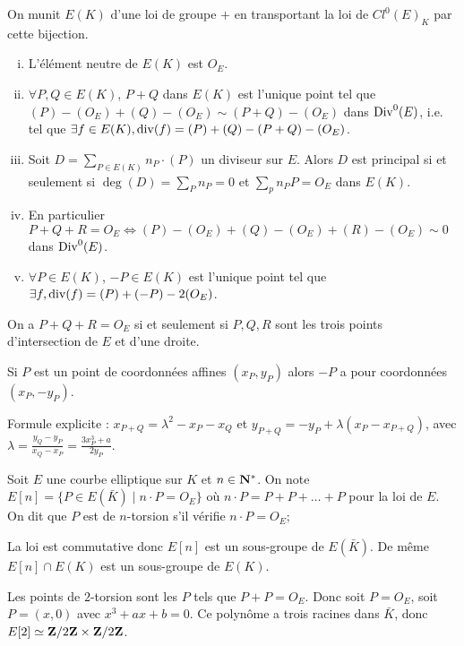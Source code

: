 	\begin{defn}
		On munit $E(K)$ d'une loi de groupe $+$ en transportant la loi de $Cl^0 (E)_K$ par cette bijection.
	\end{defn}
	
	\begin{pop}
		\begin{enumerate}[(i)]
			\item L'élément neutre de $E(K)$ est $O_E$.
			\item $\forall P,Q \in E(K)$, $P + Q$ dans $E(K)$ est l'unique point tel que $(P) - (O_E) + (Q) - (O_E) \sim (P + Q) - (O_E)$ dans $\operatorname{Div}^0(E)$, i.e. tel que $\exists f \in E(K), \operatorname{div}(f) = (P) + (Q) - (P + Q) - (O_E)$.
			\item Soit $D = \sum_{P \in E(K)} n_P \cdot (P)$ un diviseur sur $E$.
				Alors $D$ est principal si et seulement si $\deg(D) = \sum_P n_P = 0$ et $\sum_p n_P P = O_E$ dans $E(K)$.
			\item En particulier $P + Q + R = O_E \iff (P) - (O_E) + (Q) - (O_E) + (R) - (O_E) \sim 0$ dans $\operatorname{Div}^0(E)$.
			\item $\forall P \in E(K)$, $-P \in E(K)$ est l'unique point tel que $\exists f, \operatorname{div}(f) = (P) + (-P) - 2 (O_E)$.
		\end{enumerate}
	\end{pop}
	
	\begin{rem}
		On a $P + Q + R = O_E$ si et seulement si $P,Q,R$ sont les trois points d'intersection de $E$ et d'une droite.
	\end{rem}
	
	\begin{rem}
		Si $P$ est un point de coordonnées affines $(x_P,y_P)$ alors $-P$ a pour coordonnées $(x_P,-y_P)$.
	\end{rem}
	
	Formule explicite : $x_{P + Q} = \lambda^2 - x_P - x_Q$ et $y_{P + Q} = -y_P + \lambda (x_P - x_{P + Q})$, avec $\lambda = \frac{y_Q - y_P}{x_Q - x_P} = \frac{3 x_P^3 + a}{2 y_P}$.
	
	\begin{defn}
		Soit $E$ une courbe elliptique sur $K$ et $n \in \mathbf{N}^*$.
		On note $E[n] = \{ P \in E(\bar{K}) \mid n \cdot P = O_E \}$ où $n \cdot P = P + P + \ldots + P$ pour la loi de $E$.
		On dit que $P$ est de $n$-torsion s'il vérifie $n \cdot P = O_E$;
	\end{defn}
	
	\begin{rem}
		La loi est commutative donc $E[n]$ est un sous-groupe de $E(\bar K)$.
		De même $E[n] \cap E(K)$ est un sous-groupe de $E(K)$.
	\end{rem}
	
	\begin{ex}
		Les points de $2$-torsion sont les $P$ tels que $P + P = O_E$.
		Donc soit $P = O_E$, soit $P = (x,0)$ avec $x^3 + ax + b = 0$.
		Ce polynôme a trois racines dans $\bar K$, donc $E[2] \simeq \mathbf{Z}/2\mathbf{Z} \times \mathbf{Z}/2\mathbf{Z}$.
	\end{ex}
	
	